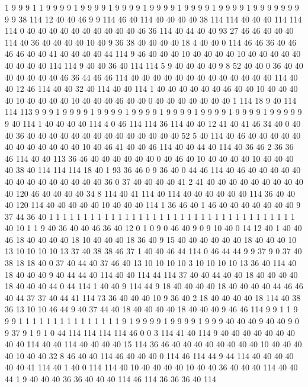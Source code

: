 1 9 9 9 1 1 9 9 9 9 1 9 9 9 9 1 9 9 9 9
1 9 9 9 9 1 9 9 9 9 1 9 9 9 9 1 9 9 9 9
9 9 9 9 9 38 114 12 40 40 46 9 9 114 46 40 114 40 40 40
40 38 114 114 40 40 40 114 114 114 0 40 40 40 40 40 40 40 40 40
40 46 36 114 40 44 40 40 93 27 46 46 40 40 40 114 40 36 40 40
40 40 10 40 9 36 38 40 40 40 40 18 4 40 40 0 114 46 46 36
40 46 46 46 40 40 41 40 40 40 40 44 114 9 46 40 40 40 10 40
40 40 40 10 40 40 40 40 40 40 40 40 40 114 114 9 40 40 36 40
114 114 5 9 40 40 40 40 9 8 52 40 40 0 36 40 40 40 40 40
40 40 46 36 44 46 46 114 40 40 40 40 40 40 40 40 40 40 40 40
40 114 40 40 12 46 114 40 40 32 40 114 40 40 114 1 40 40 40 40
40 40 46 40 40 10 40 40 40 40 10 40 40 40 40 10 40 40 40 46
40 40 0 40 40 40 40 40 40 40 1 114 18 9 40 114 114 113 9 9
9 1 9 9 9 9 1 9 9 9 9 1 9 9 9 9 1 9 9 9
9 1 9 9 9 9 1 9 9 9 9 1 9 9 9 9 9 9 40 114
1 40 40 40 40 114 4 0 46 114 114 36 114 40 40 12 41 40 41 46
34 40 0 40 40 36 40 40 40 40 40 40 40 40 40 40 40 40 40 40
52 5 40 114 40 46 40 40 40 40 40 40 40 40 40 40 40 40 10 40
46 41 40 40 46 114 40 40 44 40 114 40 36 46 2 36 36 46 114 40
40 113 36 46 40 40 40 40 40 40 0 40 46 40 10 40 40 40 40 10
40 40 40 40 38 40 114 114 114 18 40 1 93 36 46 0 9 36 40 0
44 46 114 40 46 40 40 40 40 40 40 40 40 40 40 40 40 40 40 36
0 37 40 40 40 40 41 2 41 40 40 40 40 40 40 40 40 40 40 120
46 40 40 40 40 34 8 114 40 41 114 40 114 40 40 40 40 40 40 114
36 40 40 40 120 114 40 40 40 40 40 10 40 40 40 114 1 36 46 40
1 46 40 40 40 40 40 40 40 9 37 44 36 40 1 1 1 1 1 1
1 1 1 1 1 1 1 1 1 1 1 1 1 1 1 1 1 1 1 1
1 1 1 1 1 1 1 1 1 1 40 10 1 1 9 40 36 40 40 46
36 40 12 0 1 0 9 0 46 40 9 0 9 10 40 0 14 12 40 1
40 40 46 18 40 40 40 40 18 10 40 40 40 18 36 40 9 15 40 40
40 40 40 40 18 40 40 40 10 13 10 10 10 10 13 37 40 38 38 46
37 1 40 40 46 44 114 0 46 44 44 9 9 37 9 0 37 40 38 18
18 40 0 37 40 44 40 37 46 40 13 10 10 10 10 3 10 10 10 10
13 36 40 114 40 18 40 40 40 9 40 44 44 40 114 40 40 114 44 114
37 40 40 44 40 40 18 40 40 40 40 18 40 40 40 44 0 44 114 1
40 40 9 114 44 9 18 40 40 40 40 18 40 40 40 40 44 46 46 40
44 37 37 40 44 41 114 73 36 40 40 40 10 9 36 40 2 18 40 40
40 40 18 114 40 38 36 13 10 10 46 44 9 40 37 44 40 18 40 40
40 40 18 40 40 40 9 46 46 114 9 9 1 1 9 9 9 1 1 1
1 1 1 1 1 1 1 1 1 1 1 1 9 1 9 9 9 9 1 9
9 9 9 1 9 9 9 40 40 40 9 40 40 9 0 9 37 9 1 9
1 0 44 114 114 114 114 46 0 0 3 114 41 40 114 9 40 40 40 40
40 40 40 40 40 114 40 40 114 40 40 40 40 15 114 36 46 40 40 40
40 40 40 40 40 10 40 40 40 40 10 40 40 32 8 46 40 40 114 46
40 40 40 0 114 46 114 44 9 44 114 40 40 40 40 40 40 41 114 40
1 40 0 114 114 40 10 40 40 40 40 10 40 40 36 40 40 40 114 40
40 44 1 9 40 40 40 36 36 40 40 40 114 46 114 36 36 36 40 114
